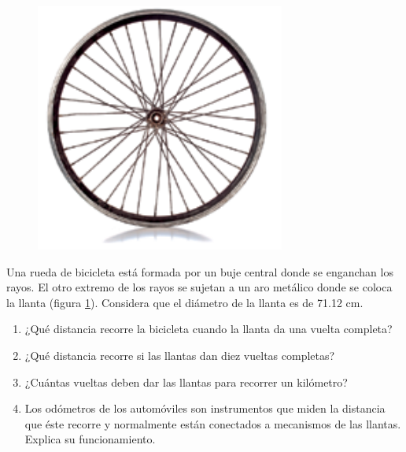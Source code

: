 \documentclass[11pt]{book}
\begin{document}
\begin{enumerate}
        \begin{minipage}[t]{0.2\textwidth}
          \begin{figure}[H]
            \centering
            \includegraphics[width=\linewidth]{rueda.png}
            \label{fig:rueda}
          \end{figure}
        \end{minipage}\hfill
        \begin{minipage}[t]{0.7\textwidth}
          \item Una rueda de bicicleta está formada por un buje central donde se enganchan los
          rayos. El otro extremo de los rayos se sujetan a un aro metálico donde se coloca
          la llanta (figura \ref{fig:rueda}). Considera que el diámetro de la llanta es de 71.12 cm.

          \begin{enumerate}
            \item ¿Qué distancia recorre la bicicleta cuando la llanta da una vuelta completa?\\
            \item ¿Qué distancia recorre si las llantas dan diez vueltas completas?\\
            \item ¿Cuántas vueltas deben dar las llantas para recorrer un kilómetro?\\
            \item Los odómetros de los automóviles son instrumentos que miden la distancia que éste
                  recorre y normalmente están conectados a mecanismos de las llantas. Explica su funcionamiento.
          \end{enumerate}
        \end{minipage}


\end{enumerate}
\end{document}
